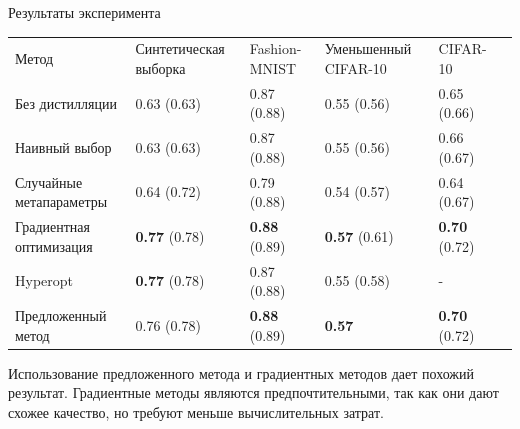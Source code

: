 \documentclass[12pt, aspectratio=169]{beamer}
\begin{document}
\begin{frame}{Результаты эксперимента}
\begin{table}
\label{table:results}
\footnotesize
\centering
\begin{tabularx}{\textwidth}{|X|X|X|X|X|X}
\cline{1-5}
Метод                      & Синтетическая выборка & Fashion-MNIST & Уменьшенный CIFAR-10 & CIFAR-10      &  \\ \cline{1-5}
Без дистилляции        & 0.63 (0.63)             & 0.87  (0.88)        & 0.55     (0.56)        & 0.65 (0.66)         &  \\ \cline{1-5}
Наивный выбор        & 0.63  (0.63)              & 0.87 (0.88)         & 0.55  (0.56)             & 0.66  (0.67)        &  \\ \cline{1-5}
Случайные метапараметры       & 0.64   (0.72)           & 0.79   (0.88)       & 0.54 (0.57)             & 0.64 (0.67)        &  \\ \cline{1-5}
Градиентная оптимизация & \textbf{0.77} (0.78)    & \textbf{0.88} (0.89) & \textbf{0.57} (0.61)    & \textbf{0.70} (0.72) &  \\ \cline{1-5}
Hyperopt                    & \textbf{0.77} (0.78)                & 0.87 (0.88)         & 0.55  (0.58)           & -             &  \\ \cline{1-5}
Предложенный метод                    & 0.76   (0.78)           & \textbf{0.88} (0.89) & \textbf{0.57}    & \textbf{0.70} (0.72) &  \\ \cline{1-5}
\end{tabularx}
\end{table}


Использование предложенного метода и градиентных методов дает похожий результат. Градиентные методы являются предпочтительными, так как они дают схожее качество, но требуют меньше вычислительных затрат.

\end{frame}
\end{document}

